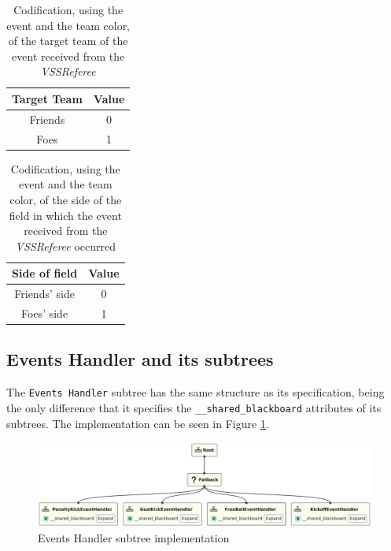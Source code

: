 \begin{table}[!htbp]
    \centering
    \begin{tabular}{c c}
        \toprule
        Target Team & Value \\
        \midrule
        Friends     & 0     \\
        Foes        & 1     \\
        \bottomrule
    \end{tabular}
    \caption{Codification, using the event and the team color, of the target team of the event received from the \textit{VSSReferee}}
    \label{tab:target_team_event_codification}
\end{table}

\begin{table}[!htbp]
    \centering
    \begin{tabular}{c c}
        \toprule
        Side of field & Value \\
        \midrule
        Friends' side & 0     \\
        Foes' side    & 1     \\
        \bottomrule
    \end{tabular}
    \caption{Codification, using the event and the team color, of the side of the field in which the event received from the \textit{VSSReferee} occurred}
    \label{tab:field_side_event_codification}
\end{table}

\subsection{Events Handler and its subtrees}

The \texttt{Events Handler} subtree has the same structure as its specification, being the only difference that it specifies the \texttt{\_\_shared\_blackboard} attributes of its subtrees. The implementation can be seen in Figure \ref{fig:events_handler_impl}.

\begin{figure}[!h]
    \centering
    \includegraphics[width=0.9\linewidth]{chapters/development/images/EventsHandler.png}
    \caption{Events Handler subtree implementation}
    \label{fig:events_handler_impl}
\end{figure}

